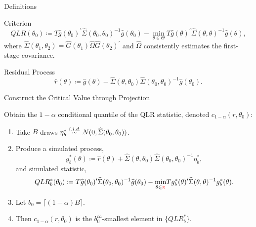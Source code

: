 \documentclass[smaller, aspectratio=169]{beamer}
\newcommand*{\rpi}{\textcolor{red}{\pi}}
\begin{document}
\begin{frame}[c]{Definitions}

    \begin{block}{Criterion}
        \begin{equation*}
          QLR(\theta_{0}) \coloneqq T \widehat{g} (\theta_{0})^{\prime}\widehat{\Sigma} (\theta_{0}, \theta_{0})^{-1}\widehat{g}(\theta_{0})-\underset{\theta \in \Theta}{\min}T\widehat{g}(\theta)^{\prime}\widehat{\Sigma} (\theta, \theta)^{-1}\widehat{g}(\theta),  
        \end{equation*}
        \quad where $\widehat{\Sigma}\left(\theta_{1}, \theta_{2}\right) = \widehat{G}(\theta_{1})\widehat{\Omega}\widehat{G}(\theta_{2})^{\prime}$ and $\widehat{\Omega}$ consistently estimates the first-stage covariance.
    \end{block}
 
    \vfill
%    
    \begin{block}{Residual Process}
        \begin{equation*}
          \widehat{r}(\theta) \coloneqq \widehat{g}(\theta)-\widehat{\Sigma}(\theta, \theta_{0})\widehat{\Sigma}(\theta_{0}, \theta_{0})^{-1}\widehat{g} (\theta_{0}). 
        \end{equation*}
    \end{block}

\end{frame}

\begin{frame}[c]{Construct the Critical Value through Projection}

Obtain the $1-\alpha $ conditional quantile of the QLR statistic, denoted $c_{1-\alpha }(r,\theta_{0})$: 
\bigskip

\begin{enumerate}
    \item Take $B$ draws $\eta_{b}^{\ast} \overset{i.i.d.}{\sim} N(0,\widehat{\Sigma}(\theta_{0},\theta_{0}))$. 
%
        \medskip
%
    \item Produce a simulated process, 
%
        \begin{equation*}
            g_{b}^{\ast}(\theta) \coloneqq \widehat{r}(\theta) + \widehat{\Sigma}(\theta, \theta_{0}) \widehat{\Sigma}(\theta_{0},\theta_{0})^{-1}\eta_{b}^{\ast},
        \end{equation*}
%
        and simulated statistic,
%
        \begin{equation*}
            QLR_{b}^{\ast}(\theta_{0}) \coloneqq T\widehat{g}(\theta_{0})^{\prime}\widehat{\Sigma}(\theta_{0},\theta_{0})^{-1}\widehat{g}(\theta_{0})-\underset{\theta \in \rpi}{\min}Tg_{b}^{\ast}(\theta)^{\prime}\widehat{\Sigma} (\theta ,\theta)^{-1}g_{b}^{\ast}(\theta).
        \end{equation*}
%
        \item  Let $b_{0}=\lceil (1-\alpha) B \rceil$. 
        \medskip
%
        \item Then $c_{1 - \alpha}(r, \theta_{0})$ is the $b_{0}^{th}$-smallest element in $\lbrace QLR_{b}^{\ast} \rbrace$.
    \end{enumerate}

\end{frame}
\end{document}
